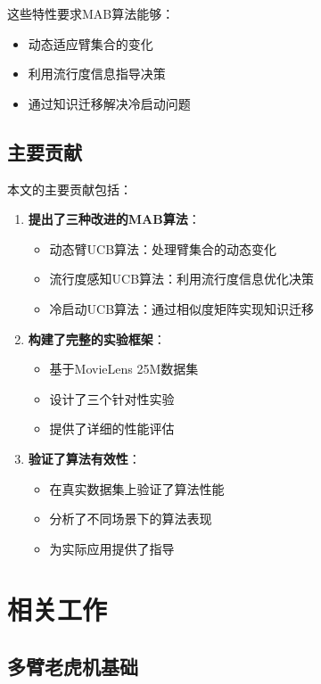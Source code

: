 \documentclass[12pt,a4paper]{article}
\begin{document}
这些特性要求MAB算法能够：
\begin{itemize}
    \item 动态适应臂集合的变化
    \item 利用流行度信息指导决策
    \item 通过知识迁移解决冷启动问题
\end{itemize}

\subsection{主要贡献}

本文的主要贡献包括：

\begin{enumerate}
    \item \textbf{提出了三种改进的MAB算法}：
    \begin{itemize}
        \item 动态臂UCB算法：处理臂集合的动态变化
        \item 流行度感知UCB算法：利用流行度信息优化决策
        \item 冷启动UCB算法：通过相似度矩阵实现知识迁移
    \end{itemize}
    
    \item \textbf{构建了完整的实验框架}：
    \begin{itemize}
        \item 基于MovieLens 25M数据集
        \item 设计了三个针对性实验
        \item 提供了详细的性能评估
    \end{itemize}
    
    \item \textbf{验证了算法有效性}：
    \begin{itemize}
        \item 在真实数据集上验证了算法性能
        \item 分析了不同场景下的算法表现
        \item 为实际应用提供了指导
    \end{itemize}
\end{enumerate}

\section{相关工作}

\subsection{多臂老虎机基础}
\end{document}
